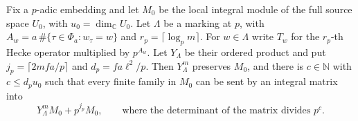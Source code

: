 \begin{lemma}
\label{lem:a-exceptional-hecke-colength}
\emitthmsource
Fix a $p$-adic embedding and let $M_0$ be the local integral module of the full source space $U_0$, with $u_0=\dim_{\mathbb C}U_0$. Let $\Lambda$ be a marking at $p$, with $A_w=a\,\#\{\tau\in\Phi_a:w_\tau=w\}$ and $r_p=\lceil\log_p m\rceil$. For $w\in\Lambda$ write $T_w$ for the $r_p$-th Hecke operator multiplied by $p^{A_w}$. Let $Y_\Lambda$ be their ordered product and put $j_p=\lceil2mfa/p\rceil$ and $d_p=fa\ell^2/p$. Then $Y_\Lambda^m$ preserves $M_0$, and there is $c\in\mathbb N$ with $c\le d_pu_0$ such that every finite family in $M_0$ can be sent by an integral matrix into
\[
 Y_\Lambda^m M_0+p^{j_p}M_0,
 \qquad\text{where the determinant of the matrix divides }p^c.
\]
\end{lemma}
